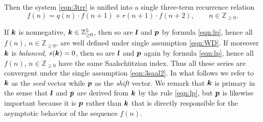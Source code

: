 \documentclass[a4paper,12pt]{article}
\theoremstyle{plain}
\def\Z{\mathbb{Z}}
\def\bk{\mbox{\boldmath $k$}}
\def\bl{\mbox{\boldmath $l$}}
\def\bp{\mbox{\boldmath $p$}}
\begin{document}
Then the system \eqref{eqn:3trr} is unified into a single three-term 
recurrence relation  
\begin{equation} \label{eqn:u3trr}
f(n) = q(n) \cdot f(n+1) + r(n+1) \cdot f(n+2), \qquad n \in \Z_{\ge 0}.    
\end{equation}  
\par
If $\bk$ is nonnegative, $\bk \in \Z_{\ge 0}^5$, then 
so are $\bl$ and $\bp$ by formula \eqref{eqn:lp}, 
hence all $f(n)$, $n \in \Z_{\ge 0}$, are well defined under single 
assumption \eqref{eqn:WD}. 
If moreover $\bk$ is {\sl balanced}, $s(\bk) = 0$, then so are $\bl$ and 
$\bp$ again by formula \eqref{eqn:lp}, hence all $f(n)$, $n \in \Z_{\ge 0}$ 
have the same Saalsch\"utzian index.    
Thus all these series are convergent under the single 
assumption \eqref{eqn:3saal2}. 
In what follows we refer to $\bk$ as the {\sl seed} vector while $\bp$ as the 
{\sl shift} vector. 
We remark that $\bk$ is primary in the sense that $\bl$ and $\bp$ 
are derived from $\bk$ by the rule \eqref{eqn:lp}, but $\bp$ is likewise  
important because it is $\bp$ rather than $\bk$ that is directly responsible 
for the asymptotic behavior of the sequence $f(n)$.   
\end{document}
